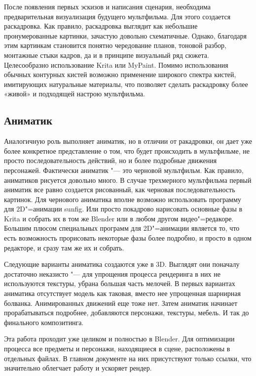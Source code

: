 \documentclass[10pt, a5paper]{article}
\begin{document}
После появления первых эскизов и написания сценария, необходима предварительная визуализация будущего мультфильма. Для этого создается раскадровка. Как правило, раскадровка выглядит как небольшие пронумерованные картинки, зачастую довольно схематичные. Однако, благодаря этим картинкам становится понятно чередование планов, тоновой разбор, монтажные стыки кадров, да и в принципе визуальный ряд сюжета. Целесообразно использование Krita или MyPaint. Помимо использования обычных контурных кистей возможно применение широкого спектра кистей, имитирующих натуральные материалы, что позволяет сделать раскадровку более «живой» и подходящей настрою мультфильма.

\subsection*{Аниматик}

Аналогичную роль выполняет аниматик, но в отличии от ракадровки, он дает уже более конкретное представление о том, что будет происходить в мультфильме, не просто последовательность действий, но и более подробные движения персонажей. Фактически аниматик "--- это черновой мультфильм. Как правило, аниматиков рисуется довольно много. В случае трехмерного мультфильма первый аниматик все равно создается рисованный, как черновая последовательность картинок. Для чернового аниматика вполне возможно использовать программу для 2D"=анимации sunfig. Или просто покадрово нарисовать основные фазы в Krita и собрать их в том же Blender или в любом другом видео"=редакоре. Большим плюсом специальных программ для 2D"=анимации является то, что есть возможность прорисовать некоторые фазы более подробно, и просто в  одном редакторе, и сразу там же их и собрать.

Следующие варианты аниматика создаются уже в 3D. Выглядят они поначалу достаточно неказисто "--- для упрощения процесса рендеринга в них не используются текстуры, убрана большая часть мелочей. В первых вариантах аниматика отсутствует модель как таковая, вместо нее упрощенная шарнирная болванка. Анимированных движений еще тоже нет. 
Затем аниматик начинает прорабатываться подробнее, добавляются персонажи, текстуры, мебель. И так до финального композитинга.

Эта работа проходит уже целиком и полностью в Blender. Для оптимизации процесса все предметы и персонажи, находящиеся в сцене, расположены в отдельных файлах. В главном документе на них присутствуют только ссылки, что значительно облегчает работу и ускоряет рендер.
\end{document}
